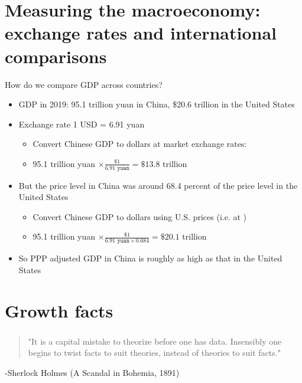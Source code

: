 \documentclass[10pt]{beamer}
\begin{document}
\section{Measuring the macroeconomy: exchange rates and international comparisons}

\begin{frame}{How do we compare GDP across countries?}
\begin{itemize}
    \item GDP in 2019: 95.1 trillion yuan in China, \$20.6 trillion in the United States \smallskip
    \item Exchange rate 1 USD = 6.91 yuan \pause
    \begin{itemize}
        \item Convert Chinese GDP to dollars at market exchange rates: \smallskip
        \item[] \hspace{1cm} 95.1 trillion yuan $\times \frac{\$1}{6.91 \texttt{ yuan}} = \$13.8$ trillion 
    \end{itemize} \smallskip
    \item But the price level in China was around 68.4 percent of the price level in the United States
    \begin{itemize}
        \item Convert Chinese GDP to dollars using U.S. prices (i.e. at ) \smallskip
        \item[] \hspace{1cm} 95.1 trillion yuan $\times \frac{\$1}{6.91 \texttt{ yuan} \times 0.684} = \$20.1$ trillion 
    \end{itemize} \smallskip
    \item So PPP adjusted GDP in China is roughly as high as that in the United States
\end{itemize}
\end{frame}



\section{Growth facts}


\begin{frame}
\frametitle{}
\bigskip
\begin{quote}
"It is a capital mistake to theorize before one has data. Insensibly one begins to twist facts to suit theories, instead of theories to suit facts."
\end{quote}
\bigskip
\begin{flushright}-Sherlock Holmes (A Scandal in Bohemia, 1891)\end{flushright}
\end{frame}
\end{document}

